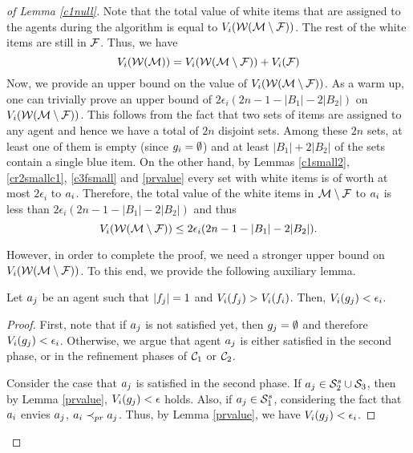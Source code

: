 \begin{proof}[of Lemma \ref{c1null}]
Note that the total value of white items that are assigned to the agents during the algorithm is equal to $V_i(\mathcal{W}(\mathcal{M} \setminus \mathcal{F}))$. The rest of the white items are still in $\mathcal{F}$. Thus, we have 
\begin{equation}
\label{fsum}
V_i(\mathcal{W}(\mathcal{M})) = V_i(\mathcal{W}(\mathcal{M} \setminus \mathcal{F})) + V_i(\mathcal{F})
\end{equation}
Now, we provide an upper bound on the value of $V_i(\mathcal{W}(\mathcal{M} \setminus \mathcal{F}))$. As a warm up, one can trivially prove an upper bound of $2\epsilon_i (2n - 1 - |B_1| - 2|B_2|)$ on $V_i(\mathcal{W}(\mathcal{M} \setminus \mathcal{F}))$. This follows from the fact that two sets of items are assigned to any agent and hence we have a total of $2n$ disjoint sets. Among these $2n$ sets, at least one of them is empty (since $g_i = \emptyset$) and at least $|B_1| + 2|B_2|$ of the sets contain a single blue item. On the other hand, by Lemmas \ref{c1small2}, \ref{cr2smallc1}, \ref{c3fsmall} and \ref{prvalue} every set with white items is of worth at most $2\epsilon_i$ to $a_i$. Therefore, the total value of the white items in $\mathcal{M} \setminus \mathcal{F}$ to $a_i$ is less than $2\epsilon_i (2n - 1 - |B_1| - 2|B_2|)$ and thus $$V_i(\mathcal{W}(\mathcal{M} \setminus \mathcal{F})) \leq 2\epsilon_i (2n - 1 - |B_1| - 2|B_2|).$$ 

However, in order to complete the proof, we need a stronger upper bound on $V_i(\mathcal{W}(\mathcal{M} \setminus \mathcal{F}))$. To this end, we provide the following auxiliary lemma.
 
\begin{lemma}
\label{eps}
Let $a_j$ be an agent such that $|f_j| = 1$ and $V_i(f_j) > V_i(f_i)$. Then, $V_i(g_j) < \epsilon_i$.
\end{lemma} 
\begin{proof}
First, note that if $a_j$ is not satisfied yet, then $g_j = \emptyset$ and therefore $V_i(g_j) < \epsilon_i$. Otherwise, we argue that agent $a_j$ is either satisfied in the second phase, or in the refinement phases of $\mathcal{C}_1$ or $\mathcal{C}_2$.

Consider the case that $a_j$ is satisfied in the second phase. If $a_j \in \mathcal{S}_2^s \cup \mathcal{S}_3$, then by Lemma \ref{prvalue}, $V_i(g_j) < \epsilon$ holds. Also, if $a_j \in \mathcal{S}_1^s$, considering the fact that $a_i$ envies $a_j$, $a_i \prec_{pr} a_j$. Thus, by Lemma \ref{prvalue}, we have $V_i(g_j)< \epsilon_i$.


\end{proof}
\end{proof}
